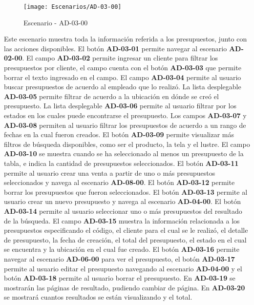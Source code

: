 \begin{figure}[H]
\centering
\texttt{[image: Escenarios/AD-03-00]}
\caption{Escenario - AD-03-00}
\label{fig:AD-03-00}
\end{figure}
Este escenario muestra toda la información referida a los presupuestos, junto con las acciones disponibles.
El botón \textbf{AD-03-01} permite navegar al escenario \textbf{AD-02-00}. El campo \textbf{AD-03-02} permite ingresar un cliente para filtrar los presupuestos por cliente, el campo cuenta con el botón \textbf{AD-03-03} que permite borrar el texto ingresado en el campo. El campo \textbf{AD-03-04} permite al usuario buscar presupuestos de acuerdo al empleado que lo realizó. La lista desplegable \textbf{AD-03-05} permite filtrar de acuerdo a la ubicación en dónde se creó el presupuesto. La lista desplegable \textbf{AD-03-06} permite al usuario filtrar por los estados en los cuales puede encontrarse el presupuesto. Los campos  \textbf{AD-03-07} y \textbf{AD-03-08} permiten al usuario filtrar los presupuestos de acuerdo a un rango de fechas en la cual fueron creados. El botón \textbf{AD-03-09} permite visualizar más filtros de búsqueda disponibles, como ser el producto, la tela y el lustre.
El campo \textbf{AD-03-10} se muestra cuando se ha seleccionado al menos un presupuesto de la tabla, e indica la cantidad de presupuestos seleccionados. El botón \textbf{AD-03-11} permite al usuario crear una venta a partir de uno o más presupuestos seleccionados y navega al escenario \textbf{AD-08-00}. El botón \textbf{AD-03-12} permite borrar los presupuestos que fueron seleccionados. El botón \textbf{AD-03-13} permite al usuario crear un nuevo presupuesto y navega al escenario \textbf{AD-04-00}.
El botón \textbf{AD-03-14} permite al usuario seleccionar uno o más presupuestos del resultado de la búsqueda. El campo \textbf{AD-03-15} muestra la información relacionada a los presupuestos especificando el código, el cliente para el cual se le realizó, el detalle de presupuesto, la fecha de creación, el total del presupuesto, el estado en el cual se encuentra y la ubicación en el cual fue creado. El botón \textbf{AD-03-16} permite navegar al escenario \textbf{AD-06-00} para ver el presupuesto, el botón \textbf{AD-03-17} permite al usuario editar el presupuesto navegando al escenario \textbf{AD-04-00} y el botón \textbf{AD-03-18} permite al usuario borrar el presupuesto. 
En  \textbf{AD-03-19} se mostrarán las páginas de resultado, pudiendo cambiar de página. En \textbf{AD-03-20} se mostrará cuantos resultados se están visualizando y el total.
\clearpage

